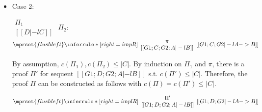 \begin{itemize}
\item Case 2:
      \begin{center}
        \scriptsize
        \begin{math}
          \begin{array}{c}
            \Pi_1 \\
            {[[D |-l C]]}
          \end{array}
        \end{math}
        \qquad\qquad
        $\Pi_2$:
        \begin{math}
          $$\mprset{flushleft}
          \inferrule* [right={\tiny impR}] {
            {
              \begin{array}{c}
                \pi \\
                {[[G1; C; G2; A |-l B]]}
              \end{array}
            }
          }{[[G1; C; G2 |-l A -> B]]}
        \end{math}
      \end{center}
      By assumption, $c(\Pi_1),c(\Pi_2)\leq |C|$. By induction on $\Pi_1$
      and $\pi$, there is a proof $\Pi'$ for sequent
      $[[G1; D; G2; A |-l B]]$ s.t. $c(\Pi') \leq |C|$. Therefore, the
      proof $\Pi$ can be constructed as follows with
      $c(\Pi) = c(\Pi') \leq |C|$.
      \begin{center}
        \scriptsize
        \begin{math}
          $$\mprset{flushleft}
          \inferrule* [right={\tiny implR}] {
            {
              \begin{array}{c}
                \Pi' \\
                {[[G1; D; G2; A |-l B]]}
              \end{array}
            }
          }{[[G1; D; G2 |-l A -> B]]}
        \end{math}
      \end{center}
\end{itemize}




